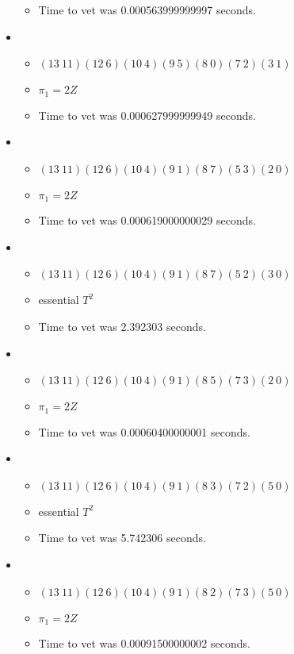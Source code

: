 \documentclass{article}
\begin{document}
\begin{itemize}
\begin{itemize}
      \item Time to vet was 0.000563999999997 seconds.
\end{itemize}
\item \begin{itemize}
      \item $(13\ 11)(12\ 6)(10\ 4)(9\ 5)(8\ 0)(7\ 2)(3\ 1)$
      \item $\pi_1 =2 Z$
      \item Time to vet was 0.000627999999949 seconds.
\end{itemize}
\item \begin{itemize}
      \item $(13\ 11)(12\ 6)(10\ 4)(9\ 1)(8\ 7)(5\ 3)(2\ 0)$
      \item $\pi_1 =2 Z$
      \item Time to vet was 0.000619000000029 seconds.
\end{itemize}
\item \begin{itemize}
      \item $(13\ 11)(12\ 6)(10\ 4)(9\ 1)(8\ 7)(5\ 2)(3\ 0)$
      \item essential $T^2$
      \item Time to vet was 2.392303 seconds.
\end{itemize}
\item \begin{itemize}
      \item $(13\ 11)(12\ 6)(10\ 4)(9\ 1)(8\ 5)(7\ 3)(2\ 0)$
      \item $\pi_1 =2 Z$
      \item Time to vet was 0.00060400000001 seconds.
\end{itemize}
\item \begin{itemize}
      \item $(13\ 11)(12\ 6)(10\ 4)(9\ 1)(8\ 3)(7\ 2)(5\ 0)$
      \item essential $T^2$
      \item Time to vet was 5.742306 seconds.
\end{itemize}
\item \begin{itemize}
      \item $(13\ 11)(12\ 6)(10\ 4)(9\ 1)(8\ 2)(7\ 3)(5\ 0)$
      \item $\pi_1 =2 Z$
      \item Time to vet was 0.00091500000002 seconds.
\end{itemize}

\end{itemize}
\end{document}

